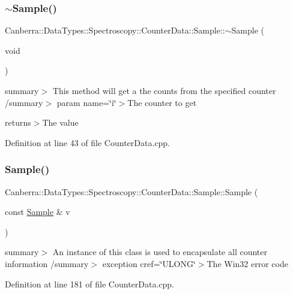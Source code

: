 \subsubsection{\texorpdfstring{$\sim$\+Sample()}{~Sample()}}
{\footnotesize\ttfamily Canberra\+::\+Data\+Types\+::\+Spectroscopy\+::\+Counter\+Data\+::\+Sample\+::$\sim$\+Sample (\begin{DoxyParamCaption}\item[{void}]{ }\end{DoxyParamCaption})\hspace{0.3cm}{\ttfamily [virtual]}}

summary$>$ This method will get a the counts from the specified counter /summary$>$ param name=\char`\"{}i\char`\"{}$>$The counter to get

returns$>$The value

Definition at line 43 of file Counter\+Data.\+cpp.

\mbox{\label{class_canberra_1_1_data_types_1_1_spectroscopy_1_1_counter_data_1_1_sample_aab83f09cadd1e87ab23ba08778f97db6_aab83f09cadd1e87ab23ba08778f97db6}} 
\subsubsection{\texorpdfstring{Sample()}{Sample()}\hspace{0.1cm}{\footnotesize\ttfamily [2/2]}}
{\footnotesize\ttfamily Canberra\+::\+Data\+Types\+::\+Spectroscopy\+::\+Counter\+Data\+::\+Sample\+::\+Sample (\begin{DoxyParamCaption}\item[{const \hyperlink{class_canberra_1_1_data_types_1_1_spectroscopy_1_1_counter_data_1_1_sample}{Sample} \&}]{v }\end{DoxyParamCaption})}

summary$>$ An instance of this class is used to encapsulate all counter information /summary$>$ exception cref=\char`\"{}\+U\+L\+O\+N\+G\char`\"{}$>$The Win32 error code

Definition at line 181 of file Counter\+Data.\+cpp.



